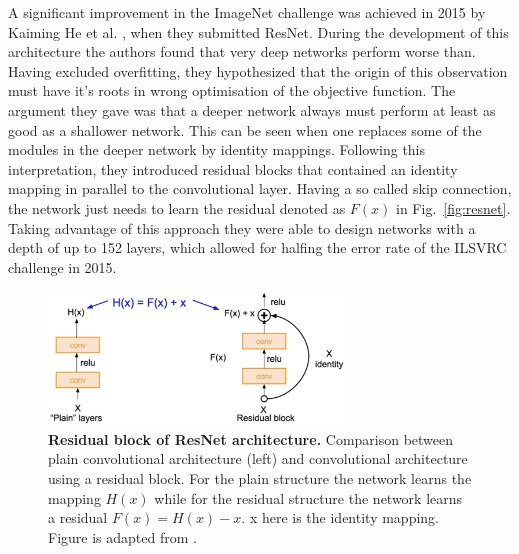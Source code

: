 A significant improvement in the ImageNet challenge was achieved in 2015 by Kaiming He et al. \parencite{he2015}, when they submitted ResNet. During the development of this architecture the authors found that very deep networks perform worse than. Having excluded overfitting, they hypothesized that the origin of this observation must have it's roots in wrong optimisation of the objective function. The argument they gave was that a deeper network always must perform at least as good as a shallower network. This can be seen when one replaces some of the modules in the deeper network by identity mappings. Following this interpretation, they introduced residual blocks that contained an identity mapping in parallel to the convolutional layer. Having a so called skip connection, the network just needs to learn the residual denoted as $F(x)$ in Fig.~\ref{fig:resnet}. Taking advantage of this approach they were able to design networks with a depth of up to 152 layers, which allowed for halfing the error rate of the ILSVRC challenge in 2015. 

\begin{figure}[h!]
	\centering
	\captionsetup{width=1\linewidth}
	\includegraphics[width=0.7\textwidth]{Figures/residual_modul.png}
	\caption{\textbf{Residual block of ResNet architecture.} Comparison between plain convolutional architecture (left) and convolutional architecture using a residual block. For the plain structure the network learns the mapping $H(x)$ while for the residual structure the network learns a residual $F(x) = H(x) - x$. x here is the identity mapping. Figure is adapted from \parencite{cs231}.}
	\label{fig:residual}
\end{figure}

